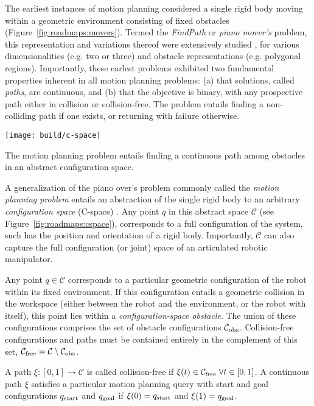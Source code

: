The earliest instances of motion planning considered a single rigid
body moving within a geometric environment consisting of
fixed obstacles
(Figure~\ref{fig:roadmaps:movers}).
Termed the \emph{FindPath} or \emph{piano mover's} problem,
this representation and variations thereof were extensively studied
\citep{lozanoperezwedley1979collisionfree,
   schwartzsharir1983pianomovers1},
for various dimensionalities (e.g. two or three)
and obstacle representations (e.g. polygonal regions).
Importantly,
these earlest problems exhibited two fundamental properties
inherent in all motion planning problems:
(a) that solutions, called \emph{paths}, are continuous, and
(b) that the objective is binary, with any
prospective path either in collision or collision-free.
The problem entails finding a non-colliding path if one exists,
or returning with failure otherwise.

\begin{marginfigure}
   \centering
   \texttt{[image: build/c-space]} %
   \caption{The motion planning problem entails finding a continuous
      path among obstacles in an abstract configuration space.}
   \label{fig:roadmaps:cspace}
\end{marginfigure}

A generalization of the piano over's problem
commonly called the \emph{motion planning problem}
entails an abstraction of the single rigid body
to an arbitrary \emph{configuration space} (C-space)
\citep{lozanoperez1983cspace}.
Any point $q$ in this abstract space $\mathcal{C}$
(see Figure~\ref{fig:roadmaps:cspace}),
corresponds to a full configuration of the system,
such has the position and orientation of a rigid body.
Importantly,
$\mathcal{C}$ can also capture the full configuration (or joint)
space of an articulated robotic manipulator.

Any point $q \in \mathcal{C}$ corresponds to a particular geometric
configuration of the robot within its fixed environment.
If this configuration entails a geometric collision in the workspace
(either between the robot and the environment,
or the robot with itself),
this point lies within a \emph{configuration-space obstacle}.
The union of these configurations comprises the set of obstacle
configurations $\mathcal{C}_{\mbox{\scriptsize obs}}$.
Collision-free configurations and paths must be contained entirely
in the complement of this set,
$\mathcal{C}_{\mbox{\scriptsize free}} = \mathcal{C} \setminus \mathcal{C}_{\mbox{\scriptsize obs}}$.

A path $\xi : [0,1] \rightarrow \mathcal{C}$
is called collision-free if
$\xi(t) \in \mathcal{C}_{\mbox{\scriptsize free}} \;\forall t \in [0,1]$.
A continuous path $\xi$ satisfies a particular motion planning query
with start and goal configurations $q_{\mbox{\scriptsize start}}$ and $q_{\mbox{\scriptsize goal}}$
if $\xi(0) = q_{\mbox{\scriptsize start}}$ and $\xi(1) = q_{\mbox{\scriptsize goal}}$.

